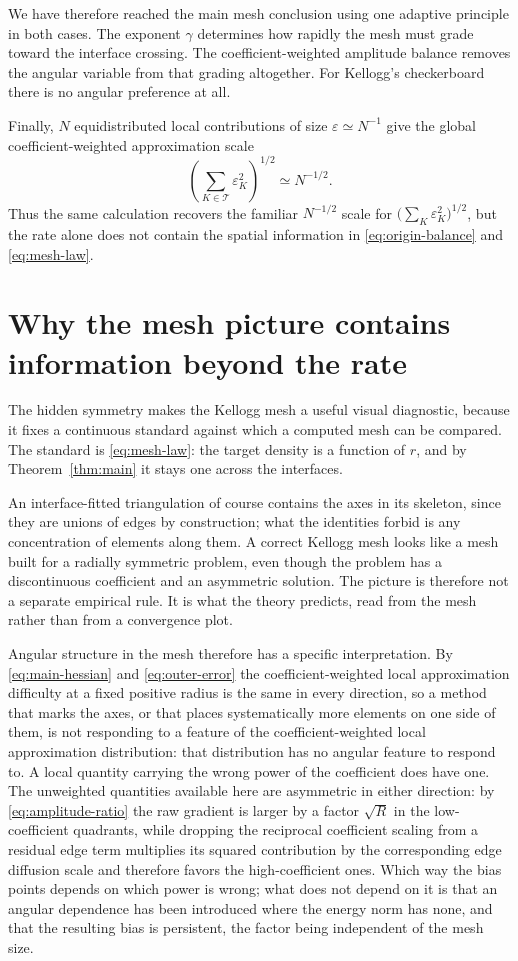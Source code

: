\documentclass[10pt,pdftex]{amsart}%
\numberwithin{equation}{section}
\newcommand{\Tcal}{\mathcal{T}}
\begin{document}
We have therefore reached the main mesh conclusion using one adaptive principle in both cases.  The exponent $\gamma$ determines how rapidly the mesh must grade toward the interface crossing.  The coefficient-weighted amplitude balance removes the angular variable from that grading altogether.  For Kellogg's checkerboard there is no angular preference at all.

Finally, $N$ equidistributed local contributions of size $\varepsilon\simeq N^{-1}$ give the global coefficient-weighted approximation scale
\[
\left(\sum_{K\in\Tcal}\varepsilon_K^2\right)^{1/2} \simeq N^{-1/2}.
\]
Thus the same calculation recovers the familiar $N^{-1/2}$ scale for $\bigl(\sum_K\varepsilon_K^2\bigr)^{1/2}$, but the rate alone does not contain the spatial information in \eqref{eq:origin-balance} and \eqref{eq:mesh-law}.

\section{Why the mesh picture contains information beyond the rate}
\label{sec:diagnostic}

The hidden symmetry makes the Kellogg mesh a useful visual diagnostic, because it fixes a continuous standard against which a computed mesh can be compared.  The standard is \eqref{eq:mesh-law}: the target density is a function of $r$, and by Theorem~\ref{thm:main} it stays one across the interfaces.

An interface-fitted triangulation of course contains the axes in its skeleton, since they are unions of edges by construction; what the identities forbid is any concentration of elements along them.  A correct Kellogg mesh looks like a mesh built for a radially symmetric problem, even though the problem has a discontinuous coefficient and an asymmetric solution.  The picture is therefore not a separate empirical rule.  It is what the theory predicts, read from the mesh rather than from a convergence plot.

Angular structure in the mesh therefore has a specific interpretation.  By \eqref{eq:main-hessian} and \eqref{eq:outer-error} the coefficient-weighted local approximation difficulty at a fixed positive radius is the same in every direction, so a method that marks the axes, or that places systematically more elements on one side of them, is not responding to a feature of the coefficient-weighted local approximation distribution: that distribution has no angular feature to respond to.  A local quantity carrying the wrong power of the coefficient does have one.  The unweighted quantities available here are asymmetric in either direction: by \eqref{eq:amplitude-ratio} the raw gradient is larger by a factor $\sqrt R$ in the low-coefficient quadrants, while dropping the reciprocal coefficient scaling from a residual edge term multiplies its squared contribution by the corresponding edge diffusion scale and therefore favors the high-coefficient ones.  Which way the bias points depends on which power is wrong; what does not depend on it is that an angular dependence has been introduced where the energy norm has none, and that the resulting bias is persistent, the factor being independent of the mesh size.
\end{document}

